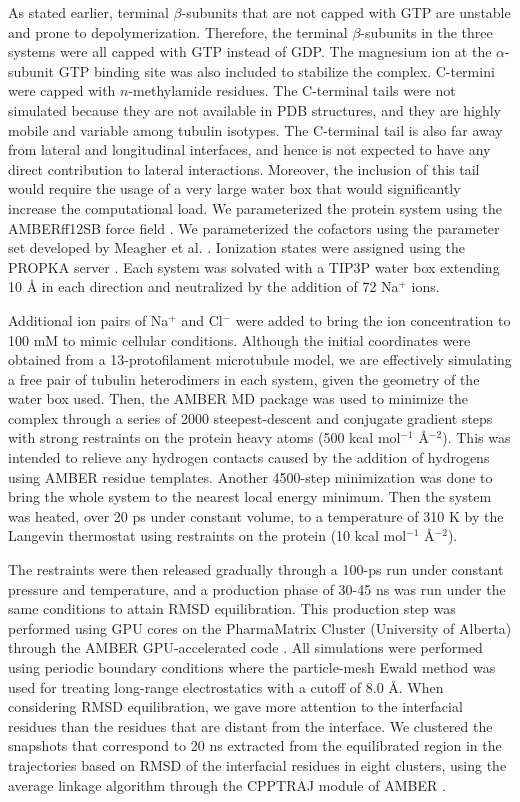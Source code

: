 \documentclass[11pt]{report}
\begin{document}
As stated earlier, terminal $\beta$-subunits that are not capped with GTP are
unstable and prone to depolymerization. Therefore, the terminal $\beta$-subunits in the three systems were all capped with GTP instead of GDP. The magnesium ion at the $\alpha$-subunit GTP binding site was also included to stabilize the complex. C-termini were capped with $n$-methylamide residues. The C-terminal tails were not simulated because they are not available in PDB structures, and they are highly mobile and variable among tubulin isotypes. The C-terminal tail is also far away from lateral and longitudinal interfaces, and hence is not expected to have any direct contribution to lateral interactions. Moreover, the inclusion of this tail would require the usage of a very large water box that would significantly increase the computational load. We parameterized the protein system using the AMBERff12SB force field
\cite{Cornell1995,Hornak2006}.
We parameterized the cofactors using the parameter set developed by Meagher et al.
\cite{Meagher2003}. Ionization states were assigned using the PROPKA server
\cite{Li2005,Bas2008,Olsson2011,Sondergaard2011}. 
Each system was solvated with a TIP3P water box extending 10 \r{A}
in each direction and neutralized by the addition of 72 Na$^{+}$ ions.

Additional ion pairs of Na$^{+}$ and Cl$^{-}$ were added to bring the ion concentration to 100 mM to mimic cellular conditions. Although the initial coordinates were obtained from a 13-protofilament microtubule model, we are effectively simulating a free pair of tubulin heterodimers in each system, given the geometry of the water box used. Then, the AMBER MD package
\cite{case2012} was used to minimize the complex through a series of 2000 steepest-descent and conjugate gradient steps with strong restraints on the protein heavy atoms (500 kcal mol$^{-1}$ \r{A}$^{-2}$). 
This was intended to relieve any
hydrogen contacts caused by the addition of hydrogens using AMBER residue templates. Another 4500-step minimization was done to bring the whole system to the nearest local energy minimum. Then the system was heated, over 20 ps under constant volume, to a temperature of 310 K by the Langevin thermostat using restraints on the protein (10 kcal mol$^{-1}$ \r{A}$^{-2}$).

The restraints were then released gradually through a 100-ps run under
constant pressure and temperature, and a production phase of 30-45 ns was run under the same conditions to attain RMSD equilibration. This production step was performed using GPU cores on the PharmaMatrix Cluster (University of Alberta) through the AMBER GPU-accelerated code
\cite{Salomon-Ferrer2013,Gotz2012,LeGrand2013}. 
All simulations were performed using periodic boundary conditions where the particle-mesh Ewald method was used for treating long-range electrostatics with a cutoff of 8.0 \r{A}. When considering RMSD equilibration, we
gave more attention to the interfacial residues than the residues that are distant from the interface. We clustered the snapshots that correspond to 20 ns extracted from the equilibrated region in the trajectories based on RMSD of the interfacial residues in eight clusters, using the average linkage algorithm
\cite{Shao2007} 
through the CPPTRAJ module of AMBER \cite{Roe2013}.
\end{document}
